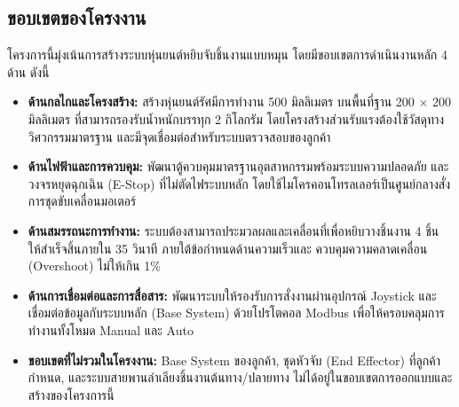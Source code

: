 \subsection{ขอบเขตของโครงงาน}
\label{subsec:project_scope}

โครงการนี้มุ่งเน้นการสร้างระบบหุ่นยนต์หยิบจับชิ้นงานแบบหมุน
โดยมีขอบเขตการดำเนินงานหลัก 4 ด้าน ดังนี้

\begin{itemize}
  \item \textbf{ด้านกลไกและโครงสร้าง:}
        สร้างหุ่นยนต์รัศมีการทำงาน 500 มิลลิเมตร บนพื้นที่ฐาน 200 $\times$ 200 มิลลิเมตร
        ที่สามารถรองรับน้ำหนักบรรทุก 2 กิโลกรัม
        โดยโครงสร้างส่วนรับแรงต้องใช้วัสดุทางวิศวกรรมมาตรฐาน
        และมีจุดเชื่อมต่อสำหรับระบบตรวจสอบของลูกค้า

  \item \textbf{ด้านไฟฟ้าและการควบคุม:}
        พัฒนาตู้ควบคุมมาตรฐานอุตสาหกรรมพร้อมระบบความปลอดภัย
        และวงจรหยุดฉุกเฉิน (E-Stop) ที่ไม่ตัดไฟระบบหลัก
        โดยใช้ไมโครคอนโทรลเลอร์เป็นศูนย์กลางสั่งการชุดขับเคลื่อนมอเตอร์

  \item \textbf{ด้านสมรรถนะการทำงาน:}
        ระบบต้องสามารถประมวลผลและเคลื่อนที่เพื่อหยิบวางชิ้นงาน 4 ชิ้น
        ให้สำเร็จสิ้นภายใน 35 วินาที ภายใต้ข้อกำหนดด้านความเร็วและ
        ควบคุมความคลาดเคลื่อน (Overshoot) ไม่ให้เกิน 1\%

  \item \textbf{ด้านการเชื่อมต่อและการสื่อสาร:}
        พัฒนาระบบให้รองรับการสั่งงานผ่านอุปกรณ์ Joystick
        และเชื่อมต่อข้อมูลกับระบบหลัก (Base System) ด้วยโปรโตคอล Modbus
        เพื่อให้ครอบคลุมการทำงานทั้งโหมด Manual และ Auto

  \item \textbf{ขอบเขตที่ไม่รวมในโครงงาน:}
        Base System ของลูกค้า, ชุดหัวจับ (End Effector) ที่ลูกค้ากำหนด,
        และระบบสายพานลำเลียงชิ้นงานต้นทาง/ปลายทาง
        ไม่ได้อยู่ในขอบเขตการออกแบบและสร้างของโครงการนี้
\end{itemize}


